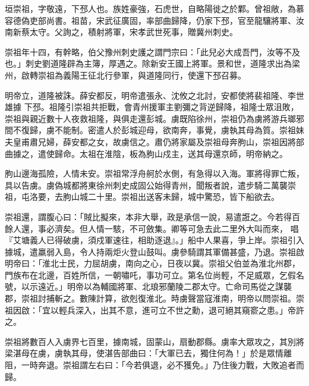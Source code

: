 
\begin{pinyinscope}

 垣崇祖，字敬遠，下邳人也。族姓豪強，石虎世，自略陽徙之於鄴。曾祖敞，為慕容德偽吏部尚書。祖苗，宋武征廣固，率部曲歸降，仍家下邳，官至龍驤將軍、汝南新蔡太守。父詢之，積射將軍，宋孝武世死事，贈冀州刺史。



 崇祖年十四，有幹略，伯父豫州刺史護之謂門宗曰：「此兒必大成吾門，汝等不及也。」刺史劉道隆辟為主簿，厚遇之。除新安王國上將軍。景和世，道隆求出為梁州，啟轉崇祖為義陽王征北行參軍，與道隆同行，使還下邳召募。



 明帝立，道隆被誅。薛安都反，明帝遣張永、沈攸之北討，安都使將裴祖隆、李世雄據
 下邳。祖隆引崇祖共拒戰，會青州援軍主劉彌之背逆歸降，祖隆士眾沮敗，崇祖與親近數十人夜救祖隆，與俱走還彭城。虜既陷徐州，崇祖仍為虜將游兵瑯邪間不復歸，虜不能制。密遣人於彭城迎母，欲南奔，事覺，虜執其母為質。崇祖妹夫皇甫肅兄婦，薛安都之女，故虜信之。肅仍將家屬及崇祖母奔朐山，崇祖因將部曲據之，遣使歸命。太祖在淮陰，板為朐山戍主，送其母還京師，明帝納之。



 朐山邊海孤險，人情未安。崇祖常浮舟舸於水側，有急得以入海。軍將得罪亡叛，具以告虜。虜偽城都將東徐州刺史成固公始得青州，聞叛者說，遣步騎二萬襲崇祖，屯洛要，去朐山城二十里。崇祖出送客未歸，城中驚恐，皆下船欲去。



 崇祖還，謂腹心曰：「賊比擬來，本非大舉，政是承信一說，易遣誑之。今若得百餘人還，事必濟矣。但人情一駭，不可斂集。卿等可急去此二里外大叫而來，
 唱『艾塘義人已得破虜，須戍軍速往，相助逐退』。」船中人果喜，爭上岸。崇祖引入據城，遣羸弱入島，令人持兩炬火登山鼓叫。虜參騎謂其軍備甚盛，乃退。崇祖啟明帝曰：「淮北士民，力屈胡虜，南向之心，日夜以冀。崇祖父伯並為淮北州郡，門族布在北邊，百姓所信，一朝嘯吒，事功可立。第名位尚輕，不足威眾，乞假名號，以示遠近。」明帝以為輔國將軍、北琅邪蘭陵二郡太守。亡命司馬從之謀襲郡，崇祖討捕斬之。數陳計算，欲剋復淮北。時虜聲當寇淮南，明帝以問崇祖。崇祖因啟：「宜以輕兵深入，出其不意，進可立不世之勳，退可絕其窺窬之患。」帝許之。



 崇祖將數百人入虜界七百里，據南城，固蒙山，扇動郡縣。虜率大眾攻之，其別將梁湛母在虜，虜執其母，使湛告部曲曰：「大軍已去，獨住何為！」於是眾情離阻，一時奔退。崇祖謂左右曰：「今若俱退，必不獲免。」乃住後力戰，大敗追者而歸。




\end{pinyinscope}
